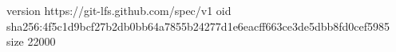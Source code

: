 version https://git-lfs.github.com/spec/v1
oid sha256:4f5c1d9bcf27b2db0bb64a7855b24277d1e6eacff663ce3de5dbb8fd0cef5985
size 22000
